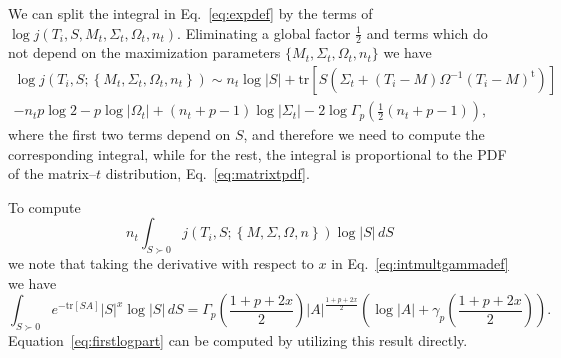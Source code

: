 \documentclass[english,listof=totoc]{scrartcl}
\begin{document}
We can split the integral in Eq.~\eqref{eq:expdef} by the terms of $\log j(T_{i},S,M_{t},\Sigma_{t},\Omega_{t},n_{t})$. Eliminating a global factor $\frac{1}{2}$ and terms which do not depend on the
maximization parameters $\{M_{t},\Sigma_{t},\Omega_{t},n_{t}\}$ we have
\begin{equation}
\begin{split}\log j(T_{i},S;\left\{M_{t},\Sigma_{t},\Omega_{t},n_{t}\right\})\sim n_{t}\log|S|+\textrm{tr}\left[S(\Sigma_{t}+(T_{i}-M)\Omega^{-1}(T_{i}-M)^{\textrm{t}})\right]\\
-n_{t}p\log2-p\log |\Omega_{t}|+(n_{t}+p-1)\log |\Sigma_{t}|-2\log\Gamma_{p}(\frac{1}{2}(n_{t}+p-1)),
\end{split}
\end{equation}
where the first two terms depend on $S$, and therefore we need to compute the corresponding integral, while for the rest, the integral is proportional to the PDF of the matrix--$t$ distribution, Eq.~\eqref{eq:matrixtpdf}.

To compute
\begin{equation}
n_{t}\int_{S\succ 0}j(T_{i},S;\left\{M,\Sigma,\Omega,n\right\})\log |S|\,dS\label{eq:firstlogpart}
\end{equation}
we note that taking the derivative with respect to $x$ in Eq.~\eqref{eq:intmultgammadef} we have
\begin{equation}
\int_{S\succ 0}e^{-\textrm{tr}\left[SA\right]}|S|^{x}\log |S|\,dS=\Gamma_{p}\left(\frac{1+p+2x}{2}\right)|A|^{\frac{1+p+2x}{2}}(\log |A|+\gamma_{p}\left(\frac{1+p+2x}{2}\right)).\label{eq:intderivative}
\end{equation}
Equation~\eqref{eq:firstlogpart} can be computed by utilizing this result directly.
\end{document}

